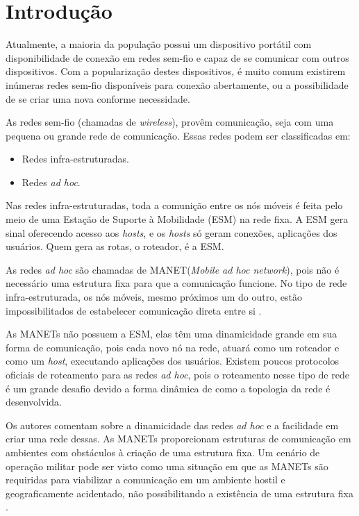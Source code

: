\section{Introdu\c{c}\~ao} 
Atualmente, a maioria da popula\c{c}\~ao possui um dispositivo port\'atil com disponibilidade de conex\~ao em redes sem-fio e capaz de se comunicar com outros dispositivos. 
Com a populariza\c{c}\~ao destes dispositivos, \'e muito comum existirem in\'umeras redes sem-fio dispon\'iveis para conex\~ao abertamente, ou a possibilidade de se criar uma nova conforme necessidade.

As redes sem-fio (chamadas de \textit{wireless}), prov\^em comunica\c{c}\~ao, seja com uma pequena ou grande rede de comunica\c{c}\~ao. 
Essas redes podem ser classificadas em:

\begin{itemize}
	\item Redes infra-estruturadas.
	\item Redes \textit{ad hoc}.
\end{itemize}

Nas redes infra-estruturadas, toda a comuni\c{c}\~ao entre os n\'os m\'oveis \'e feita pelo meio de uma Esta\c{c}\~ao de Suporte \`a Mobilidade (ESM) na rede fixa.
A ESM gera sinal oferecendo acesso aos \textit{hosts}, e os \textit{hosts} s\'o geram conex\~oes, aplica\c{c}\~oes dos usu\'arios. Quem gera as rotas, o roteador, \'e a ESM. 

As redes \textit{ad hoc} s\~ao chamadas de MANET(\textit{Mobile ad hoc network}), pois n\~ao \'e necess\'ario uma estrutura fixa para que a comunica\c{c}\~ao funcione.
No tipo de rede infra-estruturada, os n\'os m\'oveis, mesmo pr\'oximos um do outro, est\~ao impossibilitados de estabelecer comunica\c{c}\~ao direta entre si \cite{pereira}.

As MANETs n\~ao possuem a ESM, elas t\^em uma dinamicidade grande em sua forma de comunica\c{c}\~ao, pois cada novo n\'o na rede, atuar\'a como um roteador e como um \textit{host}, executando aplica\c{c}\~oes dos usu\'arios. 
Existem poucos protocolos oficiais de roteamento para as redes \textit{ad hoc}, pois  o roteamento nesse tipo de rede \'e um grande desafio devido a forma din\^ amica de como a topologia da rede \'e desenvolvida.

Os autores \cite{pepe} comentam sobre a dinamicidade das redes \textit{ad hoc} e a facilidade em criar uma rede dessas.
As MANETs proporcionam estruturas de comunica\c{c}\~ao em ambientes com obst\'aculos \`a cria\c{c}\~ao de uma estrutura fixa.
Um cen\'ario de opera\c{c}\~ao militar pode ser visto como uma situa\c{c}\~ao em que as MANETs s\~ao requiridas para viabilizar a comunica\c{c}\~ao em um ambiente hostil e geograficamente acidentado, n\~ao possibilitando a exist\^encia de uma estrutura fixa \cite{schimidt}.

